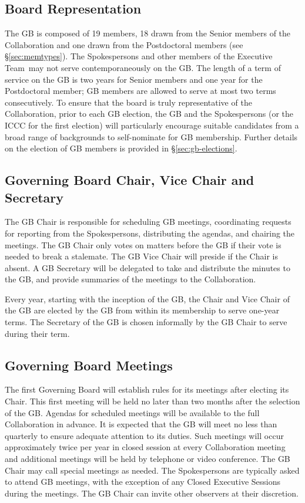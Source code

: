 \documentclass[12pt]{article}
\newcommand{\exec}{{Executive Team}}
\begin{document}
\subsection{Board Representation}

The GB is composed of 19 members, 18 drawn from the Senior members of the Collaboration and one drawn from the Postdoctoral members (see \S\ref{sec:memtypes}). The Spokespersons and other members of the \exec\ may not serve contemporaneously on the GB. The length of a term of service on the GB is two years for Senior members and one year for the Postdoctoral member; GB members are allowed to serve at most two terms consecutively. To ensure that the board is truly representative of the Collaboration, prior to each GB election,  the GB and the Spokespersons (or the ICCC for the first election) will particularly encourage suitable candidates from a broad range of backgrounds to self-nominate  for GB membership.  Further details on the election of GB members is provided in  \S\ref{sec:gb-elections}.

\subsection{Governing Board Chair, Vice Chair and Secretary}

The GB Chair is responsible for scheduling GB meetings, coordinating requests for reporting from the Spokespersons, distributing the agendas, and chairing the meetings.  The GB Chair only votes on matters before the GB if their vote is needed to break a stalemate.  The GB Vice Chair will preside if the Chair is absent. A GB Secretary will be delegated to take and distribute the minutes to the GB, and provide summaries of the meetings to the Collaboration.   

Every year, starting with the inception of the GB, the Chair and Vice Chair of the GB are elected by the GB from within its membership to serve one-year terms. The Secretary of the GB is chosen informally by the GB Chair to serve during their term. 

\subsection{Governing Board Meetings}

The first Governing Board will establish rules for its meetings after electing its Chair. This first meeting will be held no later than two months after the selection of the GB.  Agendas for scheduled meetings will be available to the full Collaboration in advance.  It is expected that the GB will meet no less than quarterly to ensure adequate attention to its duties. Such meetings will occur approximately twice per year in closed session at every Collaboration meeting and additional meetings will be held by telephone or video conference. The GB Chair may call special meetings as needed. The Spokespersons are typically asked to attend GB meetings, with the exception of any Closed Executive Sessions during the meetings.  The GB Chair can invite other observers at their discretion.
\end{document}
